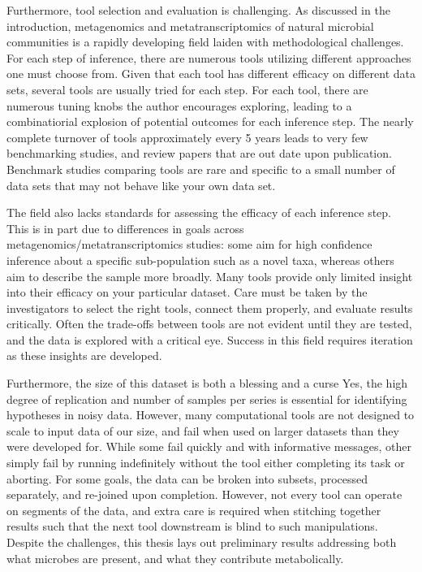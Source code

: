 Furthermore, tool selection and evaluation is challenging.
As discussed in the introduction, metagenomics and metatranscriptomics of natural microbial communities is a rapidly developing field laiden with methodological challenges.
For each step of inference, there are numerous tools utilizing different approaches one must choose from.
Given that each tool has different efficacy on different data sets, several tools are usually tried for each step.
For each tool, there are numerous tuning knobs the author encourages exploring, leading to a combinatiorial explosion of potential outcomes for each inference step.
The nearly complete turnover of tools approximately every 5 years leads to very few benchmarking studies, and review papers that are out date upon publication.
Benchmark studies comparing tools are rare and specific to a small number of data sets that may not behave like your own data set.

The field also lacks standards for assessing the efficacy of each inference step.
This is in part due to differences in goals across metagenomics/metatranscriptomics studies: some aim for high confidence inference about a specific sub-population such as a novel taxa, whereas others aim to describe the sample more broadly.
Many tools provide only limited insight into their efficacy on your particular dataset.
Care must be taken by the investigators to select the right tools, connect them properly, and evaluate results critically.
Often the trade-offs between tools are not evident until they are tested, and the data is explored with a critical eye.
Success in this field requires iteration as these insights are developed.

Furthermore, the size of this dataset is both a blessing and a curse
Yes, the high degree of replication and number of samples per series is essential for identifying hypotheses in noisy data.
However, many computational tools are not designed to scale to input data of our size, and fail when used on larger datasets than they were developed for.
While some fail quickly and with informative messages, other simply fail by running indefinitely without the tool either completing its task or aborting.
For some goals, the data can be broken into subsets, processed separately, and re-joined upon completion.
However, not every tool can operate on segments of the data, and extra care is required when stitching together results such that the next tool downstream is blind to such manipulations.
Despite the challenges, this thesis lays out preliminary results addressing both what microbes are present, and what they contribute metabolically.


